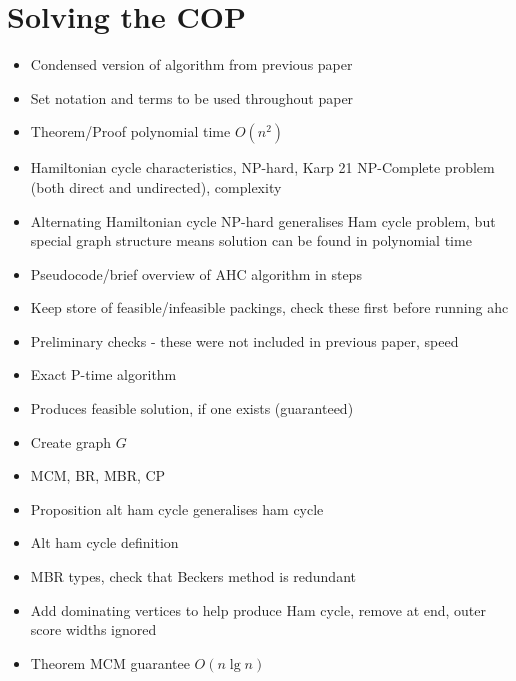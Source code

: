 \documentclass{elsarticle}
\begin{document}
\section{Solving the COP}
\begin{itemize}
	\item Condensed version of algorithm from previous paper
	\item Set notation and terms to be used throughout paper
	\item Theorem/Proof polynomial time $O(n^2)$
	\item Hamiltonian cycle characteristics, NP-hard, Karp 21 NP-Complete problem (both direct and undirected), complexity
	\item Alternating Hamiltonian cycle NP-hard generalises Ham cycle problem, but special graph structure means solution can be found in polynomial time
	\item Pseudocode/brief overview of AHC algorithm in steps
	\item Keep store of feasible/infeasible packings, check these first before running ahc
	\item Preliminary checks - these were not included in previous paper, speed
	\item Exact P-time algorithm
	\item Produces feasible solution, if one exists (guaranteed)
	\item Create graph $G$
	\item MCM, BR, MBR, CP
	\item Proposition alt ham cycle generalises ham cycle
	\item Alt ham cycle definition
	\item MBR types, check that Beckers method is redundant
	\item Add dominating vertices to help produce Ham cycle, remove at end, outer score widths ignored
	\item Theorem MCM guarantee $O(n \lg n)$
\end{itemize}
\end{document}
